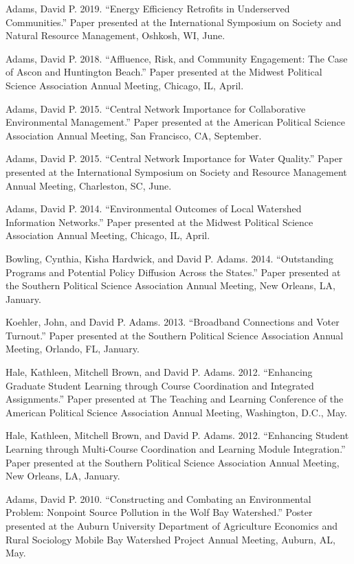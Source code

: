 \documentclass[12pt,letterpaper]{article}
\renewenvironment{itemize}{
  \begin{list}{}{
    \setlength{\leftmargin}{1.5em}
    \setlength{\itemsep}{0.25em}
    \setlength{\parskip}{0pt}
    \setlength{\parsep}{0.25em}
  }
}{
  \end{list}
}
\begin{document}
\begin{itemize}
      \item Adams, David P. 2019. ``Energy Efficiency Retrofits in Underserved Communities.'' Paper presented at the International Symposium on Society and Natural Resource Management, Oshkosh, WI, June.
      
      \item Adams, David P. 2018. ``Affluence, Risk, and Community Engagement: The Case of Ascon and Huntington Beach.'' Paper presented at the Midwest Political Science Association Annual Meeting, Chicago, IL, April.
      
      \item Adams, David P. 2015. ``Central Network Importance for Collaborative Environmental Management.'' Paper presented at the American Political Science Association Annual Meeting, San Francisco, CA, September.
      
      \item Adams, David P. 2015. ``Central Network Importance for Water Quality.'' Paper presented at the International Symposium on Society and Resource Management Annual Meeting, Charleston, SC, June.
      
      \item Adams, David P. 2014. ``Environmental Outcomes of Local Watershed Information Networks.'' Paper presented at the Midwest Political Science Association Annual Meeting, Chicago, IL, April.
      
      \item Bowling, Cynthia, Kisha Hardwick, and David P. Adams. 2014. ``Outstanding Programs and Potential Policy Diffusion Across the States.'' Paper presented at the Southern Political Science Association Annual Meeting, New Orleans, LA, January.
      
      \item Koehler, John, and David P. Adams. 2013. ``Broadband Connections and Voter Turnout.'' Paper presented at the Southern Political Science Association Annual Meeting, Orlando, FL, January.
      
      \item Hale, Kathleen, Mitchell Brown, and David P. Adams. 2012. ``Enhancing Graduate Student Learning through Course Coordination and Integrated Assignments.'' Paper presented at The Teaching and Learning Conference of the American Political Science Association Annual Meeting, Washington, D.C., May.
      
      \item Hale, Kathleen, Mitchell Brown, and David P. Adams. 2012. ``Enhancing Student Learning through Multi-Course Coordination and Learning Module Integration.'' Paper presented at the Southern Political Science Association Annual Meeting, New Orleans, LA, January.
      
      \item Adams, David P. 2010. ``Constructing and Combating an Environmental Problem: Nonpoint Source Pollution in the Wolf Bay Watershed.'' Poster presented at the Auburn University Department of Agriculture Economics and Rural Sociology Mobile Bay Watershed Project Annual Meeting, Auburn, AL, May.
  \end{itemize}
  
\end{document}

